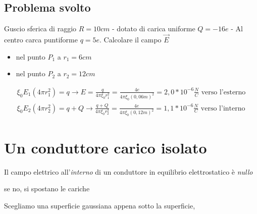 \documentclass{book}
\begin{document}
\subsection{Problema svolto}
Guscio sferica di raggio $R=10cm$ - dotato di carica uniforme $Q=-16e$ - Al centro carca puntiforme $q=5e$. Calcolare il campo $\vec{E}$
\begin{itemize}
\item nel punto $P_1$ a $r_1=6cm$
\item nel punto $P_2$ a $r_2=12cm$
\end{itemize}
\begin{eqnarray*}
  \xi_0 E_1(4\pi r_1^2)=q\to E=\frac{q}{4\pi \xi_0 r^2_1}=\frac{4e}{4\pi \xi_0 (0,06m)^2}=2,0*10^{-6}\frac{N}{C} \text{ verso l'esterno}\\
  \xi_0 E_2 (4\pi r^2_2)=q+Q\to \frac{q+Q}{4\pi \xi_0 r^2_2}=\frac{4e}{4\pi \xi_0 (0,12m)^2}=1,1 *10^{-6}\frac{N}{C} \text{ verso l'interno}
\end{eqnarray*}
\section{Un conduttore carico isolato}
Il campo elettrico all'\textit{interno} di un conduttore in equilibrio elettrostatico è \textit{nullo}
\begin{center}
	se no, si spostano le cariche
\end{center}
Scegliamo una superficie gaussiana appena sotto la superficie,
\end{document}
